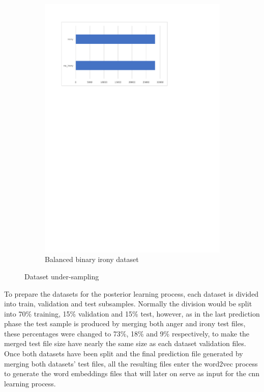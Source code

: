 \begin{figure}[!htp]
\begin{subfigure}[b]{0.5\textwidth}
    \includegraphics[width=\linewidth]{figures/binary_irony_dataset_distribution}
    \caption{Balanced binary irony dataset}
    \label{fig:binary_irony_dataset_distribution}
  \end{subfigure}%
  \caption{Dataset under-sampling}\label{fig:dataset_undersampling}
\end{figure}

To prepare the datasets for the posterior learning process, each dataset is divided into train, validation and test subsamples. Normally the division would be split into 70\% training, 15\% validation and 15\% test, however, as in the last prediction phase the test sample is produced by merging both anger and irony test files, these percentages were changed to 73\%, 18\% and 9\% respectively, to make the merged test file size have nearly the same size as each dataset validation files. Once both datasets have been split and the final prediction file generated by merging both datasets' test files, all the resulting files enter the word2vec process to generate the word embeddings files that will later on serve as input for the \acrshort{cnn} learning process.

